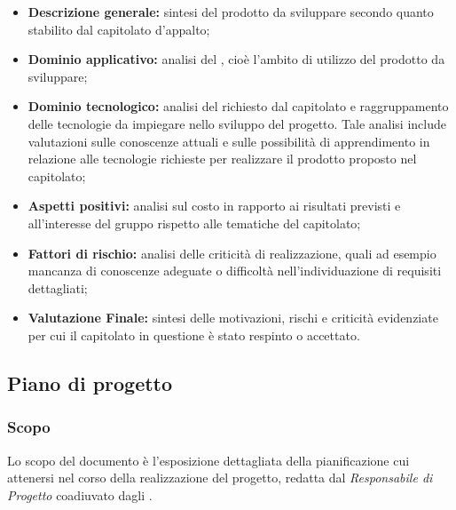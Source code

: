 \documentclass[../NormediProgetto.tex]{subfiles}
\begin{document}
\begin{itemize}
    \item \textbf{Descrizione generale:} sintesi del prodotto da sviluppare secondo quanto stabilito dal capitolato d'appalto;
    
    \item \textbf{Dominio applicativo:} analisi del , cioè l'ambito di utilizzo del prodotto da sviluppare;
    
    \item \textbf{Dominio tecnologico:} analisi del  richiesto dal capitolato e raggruppamento delle tecnologie da impiegare nello sviluppo del progetto. Tale analisi include valutazioni sulle conoscenze attuali e sulle possibilità di apprendimento in relazione alle tecnologie richieste per realizzare il prodotto proposto nel capitolato;
    
    \item \textbf{Aspetti positivi:} analisi sul costo in rapporto ai risultati previsti e all’interesse del gruppo rispetto alle tematiche del capitolato;
    
    \item \textbf{Fattori di rischio:} analisi delle criticità di realizzazione, quali ad esempio mancanza di conoscenze adeguate o difficoltà nell’individuazione di requisiti dettagliati;
    
    \item \textbf{Valutazione Finale:} sintesi delle motivazioni, rischi e criticità evidenziate per cui il capitolato in questione è stato respinto o accettato.
\end{itemize}


\subsection{Piano di progetto}

\subsubsection{Scopo}

Lo scopo del documento è l'esposizione dettagliata della pianificazione cui attenersi nel corso della realizzazione del progetto, redatta dal \textit{Responsabile di Progetto} coadiuvato dagli . 
\end{document}
